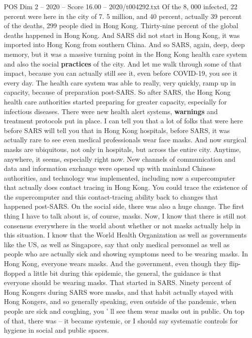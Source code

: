 \begin{textsample}{POS Dim 2 – 2020 – Score 16.00 – 2020/t004292.txt}
Of the 8, 000 infected, 22 percent were here in the city of 7. 5 million, and 40 percent, actually 39 percent of the deaths, 299 people died in Hong Kong.
Thirty-nine percent of the global deaths happened in Hong Kong.
And SARS did not start in Hong Kong, it was imported into Hong Kong from southern China.
And so SARS, again, deep, deep memory, but it was a massive turning point in the Hong Kong health care system and also the social \textbf{practices} of the city.
And let me walk through some of that impact, because you can actually still see it, even before COVID-19, you see it every day.
The health care system was able to really, very quickly, ramp up in capacity, because of preparation post-SARS.
So after SARS, the Hong Kong health care authorities started preparing for greater capacity, especially for infectious diseases.
There were new health alert systems, \textbf{warnings} and treatment protocols put in place.
I can tell you that a lot of folks that were here before SARS will tell you that in Hong Kong hospitals, before SARS, it was actually rare to see even medical professionals wear face masks.
And now surgical masks are ubiquitous, not only in hospitals, but across the entire city.
Anytime, anywhere, it seems, especially right now.
New channels of communication and data and information exchange were opened up with mainland Chinese authorities, and technology was implemented, including now a supercomputer that actually does contact tracing in Hong Kong.
You could trace the existence of the supercomputer and this contact-tracing ability back to changes that happened post-SARS.
On the social side, there was also a huge change.
The first thing I have to talk about is, of course, masks.
Now, I know that there is still not consensus everywhere in the world about whether or not masks actually help in this situation.
I know that the World Health Organization as well as governments like the US, as well as Singapore, say that only medical personnel as well as people who are actually sick and showing symptoms need to be wearing masks.
In Hong Kong, everyone wears masks.
And the government, even though they flip-flopped a little bit during this epidemic, the general, the guidance is that everyone should be wearing masks.
That started in SARS.
Ninety percent of Hong Kongers during SARS wore masks, and that habit actually stayed with Hong Kongers, and so generally speaking, even outside of the pandemic, when people are sick and coughing, you ' ll see them wear masks out in public.
On top of that, there was -- it became systemic, or I should say systematic controls for hygiene in social and public spaces.

\end{textsample}
